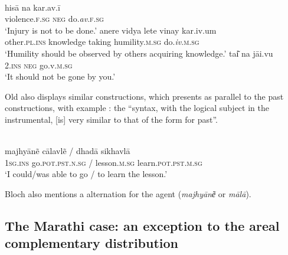 \documentclass[output=paper]{langsci/langscibook}
\begin{document}
\ea\label{ex:montaut:29}
\ea 
{}\\
\gll hisā   na   kar.av.ī\\
violence.\textsc{f.sg}  \textsc{neg}   do.\textit{av}\textsc{.f.sg} \\
\glt ‘Injury is not to be done.’ \citep[120]{Tessitori19141916}
\ex 
\gll anere vidya  lete  vinay             kar.iv.um\\
other.\textsc{pl.ins}  knowledge taking     humility.\textsc{m.sg}     do.\textit{iv}.\textsc{m.sg}  \\
\glt ‘Humility should be observed by others acquiring knowledge.’ \citep[120]{Tessitori19141916}
\ex 
\gll tai͂    na   jāi.vu\\
 \textsc{2.ins} \textsc{neg} go.v.\textsc{m.sg} \\
\glt ‘It should not be gone by you.’ \citep[101]{Khokhlova2013}
\z 
\z 

Old  also displays similar constructions, which \citet[264]{Bloch1970[1920]} presents as parallel to the past constructions, with example : the “syntax, with the logical subject in the instrumental, [is] very similar to that of the form for past”.  

\ea\label{ex:montaut:30}
\\
 \gll majhyān\~{e}    cālavl\~{e}               / dhadā         sikhavlā  \\
 \textsc{1sg.ins} go.\textsc{pot.pst.n.sg}   / lesson.\textsc{m.sg}    learn.\textsc{pot.pst.m.sg}  \\
\glt ‘I could/was able to go / to learn the lesson.’ \citep[265]{Bloch1970[1920]}
\z 

Bloch also mentions a  alternation for the agent (\textit{majhyāne͂} or \textit{mālā}).

\subsection{The Marathi case: an exception to the areal complementary distribution}\label{sec:montaut:3.4}
\end{document}
